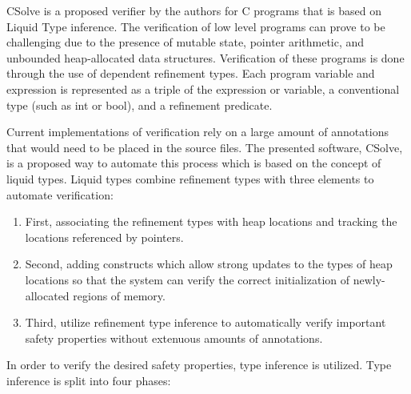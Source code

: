 
\usepackage{algorithm}
\usepackage{listings}
\usepackage{graphicx,amssymb,amsmath}
\usepackage{epstopdf}
\usepackage{setspace}
\sloppy

\oddsidemargin 0in
\evensidemargin 0in
\textwidth 6.5in
\topmargin -0.5in
\textheight 9.0in




\pagestyle{myheadings}  %
	 	
\doublespacing		
		
CSolve is a proposed verifier by the authors for C programs that is based on Liquid Type inference.  The verification of low level programs can prove to be challenging due to the presence of mutable state, pointer arithmetic, and unbounded heap-allocated data structures. Verification of these programs is done through the use of dependent refinement types.  Each program variable and expression is represented as a triple of the expression or variable, a conventional type (such as int or bool), and a refinement predicate.

Current implementations of verification rely on a large amount of annotations that would need to be placed in the source files. The presented software, CSolve, is a proposed way to automate this process which is based on the concept of liquid types. Liquid types combine refinement types with three elements to automate verification:

\begin{enumerate}
	\item First, associating the refinement types with heap locations and tracking the locations referenced by pointers.
	\item Second, adding constructs which allow strong updates to the types of heap locations so that the system can verify the correct initialization of newly-allocated regions of memory.
	\item Third, utilize refinement type inference to automatically verify important safety properties without extenuous amounts of annotations.
\end{enumerate}


In order to verify the desired safety properties, type inference is utilized. Type inference is split into four phases:

